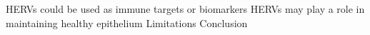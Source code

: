HERVs could be used as immune targets or biomarkers
HERVs may play a role in maintaining healthy epithelium
Limitations
Conclusion
